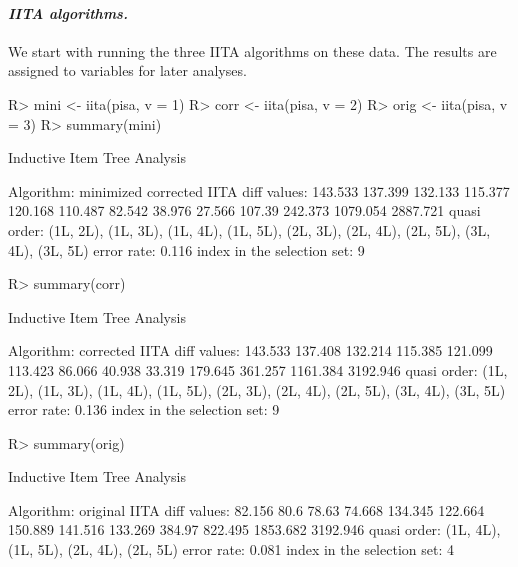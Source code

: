 \documentclass[nojss]{jss}
\begin{document}
\paragraph{\it IITA algorithms.}
We start with running the three IITA algorithms on these data. The results are assigned to variables for later analyses.
\begin{Schunk}
\begin{Sinput}
R> mini <- iita(pisa, v = 1)
R> corr <- iita(pisa, v = 2)
R> orig <- iita(pisa, v = 3)
R> summary(mini)
\end{Sinput}
\begin{Soutput}
 	 Inductive Item Tree Analysis

Algorithm: minimized corrected IITA
diff values: 143.533 137.399 132.133 115.377 120.168 110.487 82.542 38.976 27.566 107.39 242.373 1079.054 2887.721  
quasi order: {(1L, 2L), (1L, 3L), (1L, 4L), (1L, 5L), (2L, 3L), (2L, 4L),
 (2L, 5L), (3L, 4L), (3L, 5L)}
error rate: 0.116
index in the selection set: 9
\end{Soutput}
\begin{Sinput}
R> summary(corr)
\end{Sinput}
\begin{Soutput}
 	 Inductive Item Tree Analysis

Algorithm: corrected IITA
diff values: 143.533 137.408 132.214 115.385 121.099 113.423 86.066 40.938 33.319 179.645 361.257 1161.384 3192.946  
quasi order: {(1L, 2L), (1L, 3L), (1L, 4L), (1L, 5L), (2L, 3L), (2L, 4L),
 (2L, 5L), (3L, 4L), (3L, 5L)}
error rate: 0.136
index in the selection set: 9
\end{Soutput}
\begin{Sinput}
R> summary(orig)
\end{Sinput}
\begin{Soutput}
 	 Inductive Item Tree Analysis

Algorithm: original IITA
diff values: 82.156 80.6 78.63 74.668 134.345 122.664 150.889 141.516 133.269 384.97 822.495 1853.682 3192.946  
quasi order: {(1L, 4L), (1L, 5L), (2L, 4L), (2L, 5L)}
error rate: 0.081
index in the selection set: 4
\end{Soutput}
\end{Schunk}
\end{document}
